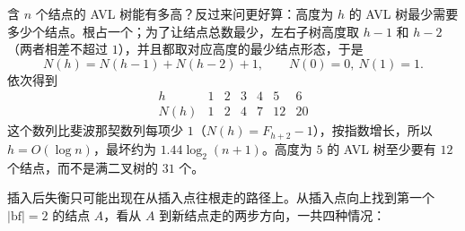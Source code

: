 含 $n$ 个结点的 AVL 树能有多高？反过来问更好算：高度为 $h$ 的 AVL 树最少需要多少个结点。根占一个；为了让结点总数最少，左右子树高度取 $h-1$ 和 $h-2$（两者相差不超过 $1$），并且都取对应高度的最少结点形态，于是
\[
N(h)=N(h-1)+N(h-2)+1,\qquad N(0)=0,\ N(1)=1.
\]
依次得到
\[
\begin{array}{c|cccccc}
h & 1 & 2 & 3 & 4 & 5 & 6\\ \hline
N(h) & 1 & 2 & 4 & 7 & 12 & 20
\end{array}
\]
这个数列比斐波那契数列每项少 $1$（$N(h)=F_{h+2}-1$），按指数增长，所以 $h=O(\log n)$，最坏约为 $1.44\log_2(n+1)$。高度为 $5$ 的 AVL 树至少要有 $12$ 个结点，而不是满二叉树的 $31$ 个。

插入后失衡只可能出现在从插入点往根走的路径上。从插入点向上找到第一个 $|\mathrm{bf}|=2$ 的结点 $A$，看从 $A$ 到新结点走的两步方向，一共四种情况：

